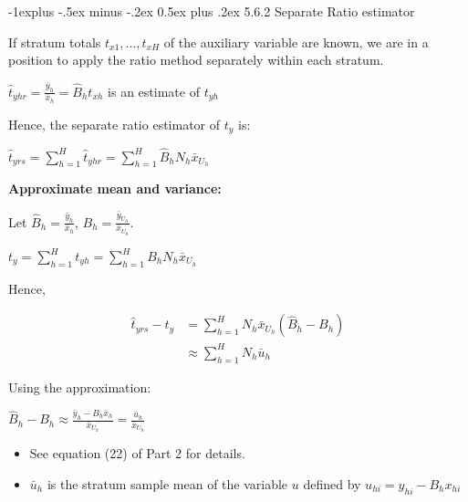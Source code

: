 \documentclass[10pt,landscape]{article}
\makeatletter
\renewcommand{\subsection}{\@startsection{subsection}{2}{0mm}%
                                {-1explus -.5ex minus -.2ex}%
                                {0.5ex plus .2ex}%
                                {\normalfont\normalsize\bfseries}}
\makeatother
\begin{document}
\begin{multicols}{3}
\subsection{5.6.2 Separate Ratio estimator}

If stratum totals $t_{x1}, ... , t_{xH}$ of the auxiliary variable are known, we are in a position to apply the ratio method separately within each stratum.

\begin{center}
  $\hat{t}_{yhr} = \frac{\bar{y}_{h}}{\bar{x}_{h}} = \hat{B}_{h}t_{xh}$ is an estimate of $t_{yh}$
\end{center}

Hence, the separate ratio estimator of $t_{y}$ is:

\begin{center}
  $\hat{t}_{yrs} = \sum_{h=1}^{H}\hat{t}_{yhr} = \sum_{h=1}^{H}\hat{B}_{h}N_{h}\bar{x}_{U_{h}}$
\end{center}

\textbf{Approximate mean and variance:}

\vspace{5}

Let $\hat{B}_{h} = \frac{\bar{y}_{h}}{\bar{x}_{h}}$, $B_{h} = \frac{\bar{y}_{U_{h}}}{\bar{x}_{U_{h}}}$.

\begin{center}
  $t_{y} = \sum_{h=1}^{H}t_{yh} = \sum_{h=1}^{H}B_{h}N_{h}\bar{x}_{U_{h}}$
\end{center}

Hence,

\begin{equation}
  \begin{split}
  \hat{t}_{yrs}-t_{y} &= \sum_{h=1}^{H}N_{h}\bar{x}_{U_{h}}(\hat{B}_{h} - B_{h}) \\
  &\approx \sum_{h=1}^{H}N_{h}\bar{u}_{h}
\end{split}
\end{equation}

Using the approximation:
\begin{center}
  $\hat{B}_{h} - B_{h} \approx \frac{\bar{y}_{h} - B_{h}\bar{x}_{h}}{\bar{x}_{U_{h}}} = \frac{\bar{u}_{h}}{\bar{x}_{U_{h}}}$
\end{center}

\begin{itemize}
  \item See equation (22) of Part 2 for details.
  \item $\bar{u}_{h}$ is the stratum sample mean of the variable $u$ defined by $u_{hi} = y_{hi} - B_{h}x_{hi}$
\end{itemize}


\end{multicols}
\end{document}
